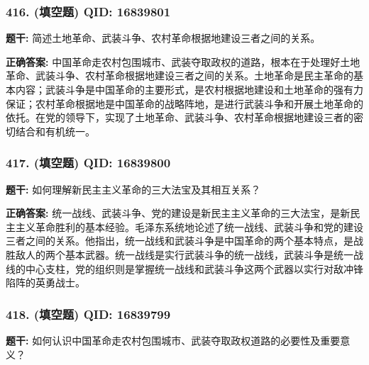 \documentclass[12pt,UTF8]{ctexart}
\begin{document}
\subsubsection*{416. (填空题) \small QID: 16839801}

\textbf{题干:}
简述土地革命、武装斗争、农村革命根据地建设三者之间的关系。

\textbf{正确答案:}
中国革命走农村包围城市、武装夺取政权的道路，根本在于处理好土地革命、武装斗争、农村革命根据地建设三者之间的关系。土地革命是民主革命的基本内容；武装斗争是中国革命的主要形式，是农村根据地建设和土地革命的强有力保证；农村革命根据地是中国革命的战略阵地，是进行武装斗争和开展土地革命的依托。在党的领导下，实现了土地革命、武装斗争、农村革命根据地建设三者的密切结合和有机统一。

\vspace{0.3em}\hrulefill\vspace{0.7em}

\subsubsection*{417. (填空题) \small QID: 16839800}

\textbf{题干:}
如何理解新民主主义革命的三大法宝及其相互关系？

\textbf{正确答案:}
统一战线、武装斗争、党的建设是新民主主义革命的三大法宝，是新民主主义革命胜利的基本经验。毛泽东系统地论述了统一战线、武装斗争和党的建设三者之间的关系。他指出，统一战线和武装斗争是中国革命的两个基本特点，是战胜敌人的两个基本武器。统一战线是实行武装斗争的统一战线，武装斗争是统一战线的中心支柱，党的组织则是掌握统一战线和武装斗争这两个武器以实行对敌冲锋陷阵的英勇战士。

\vspace{0.3em}\hrulefill\vspace{0.7em}

\subsubsection*{418. (填空题) \small QID: 16839799}

\textbf{题干:}
如何认识中国革命走农村包围城市、武装夺取政权道路的必要性及重要意义？
\end{document}

